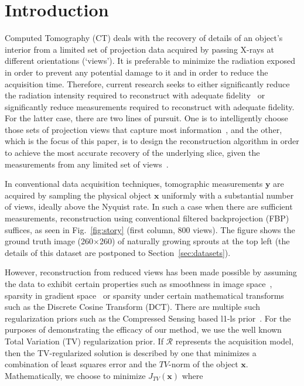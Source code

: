 \documentclass[journal]{IEEEtran}
\begin{document}
%
\IEEEpeerreviewmaketitle



\section{Introduction}
\label{sec:intro}
Computed Tomography (CT) deals with the recovery of details of an
object's interior from a limited set of projection data acquired by
passing X-rays at different orientations (`views'). It is preferable
to minimize the radiation exposed in order to prevent any potential
damage to it and in order to reduce the acquisition time. Therefore,
current research seeks to either significantly reduce the radiation
intensity required to reconstruct with adequate
fidelity~\cite{yang2018,Lin2016,Xie2017,gopal2019low} or significantly
reduce measurements required to reconstruct with
adequate fidelity. For the latter case, there are two lines of
pursuit. One is to intelligently choose those sets of projection views
that capture most
information~\cite{King2018,Anthony2018,barkan17,fischer16,andrei14},
and the other, which is the focus of this paper, is to design the
reconstruction algorithm in order to achieve the most accurate
recovery of the underlying slice, given the measurements from any
limited set of views~\cite{yang2018,geyer2015,kilic2011}.

In conventional data acquisition techniques, tomographic measurements
$\boldsymbol{y}$ are acquired by sampling the physical object
$\boldsymbol{x}$ uniformly with a substantial number of views, ideally
above the Nyquist rate. In such a case when there are sufficient
measurements, reconstruction using conventional filtered
backprojection (FBP) suffices, as seen in Fig.~\ref{fig:story} (first
column, 800 views). The figure shows the ground truth image
(260$\times$260) of naturally growing sprouts at the top left (the
details of this dataset are postponed to Section~\ref{sec:datasets}).

However, reconstruction from reduced views has been made possible by
assuming the data to exhibit certain properties such as smoothness in
image space~\cite{Essam2015}, sparsity in gradient space~\cite{TV} or sparsity under
certain mathematical transforms~\cite{Donoho,introCS} such as the
Discrete Cosine Transform (DCT).  There are multiple such
regularization priors such as the Compressed
Sensing based l1-ls prior~\cite{my_dicta_paper}. For the purposes of
demonstrating the efficacy of our method, we use the well known Total Variation (TV)
regularization prior.
If $\boldsymbol{\mathcal{R}}$ represents the acquisition
model, then the TV-regularized solution is described by one that
minimizes a combination of least squares error and the $TV$-norm of
the object $\boldsymbol{x}$. Mathematically, we choose to minimize
$J_{TV}(\boldsymbol{x})$ where
\end{document}
